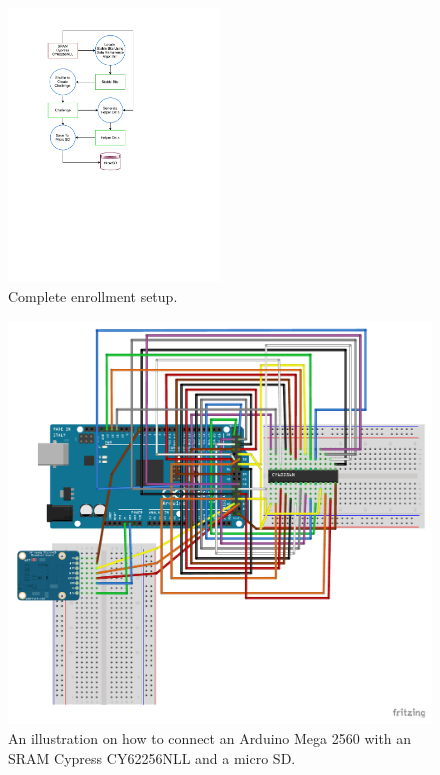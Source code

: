 \begin{figure}[tph!]
    \centerline{\includegraphics[width={0.5\textwidth}]{images/enrollment}}
    \caption{Complete enrollment setup.}
    \label{fig:enrollment}
\end{figure}

\begin{figure}[tph!]
    \centerline{\includegraphics[width={\textwidth}]{images/CY62256-new-SD_bb}}
    \caption{An illustration on how to connect an Arduino Mega 2560 with an SRAM Cypress CY62256NLL and a micro SD.}
    \label{fig:cy62256nll_scheme_sd}
\end{figure}

